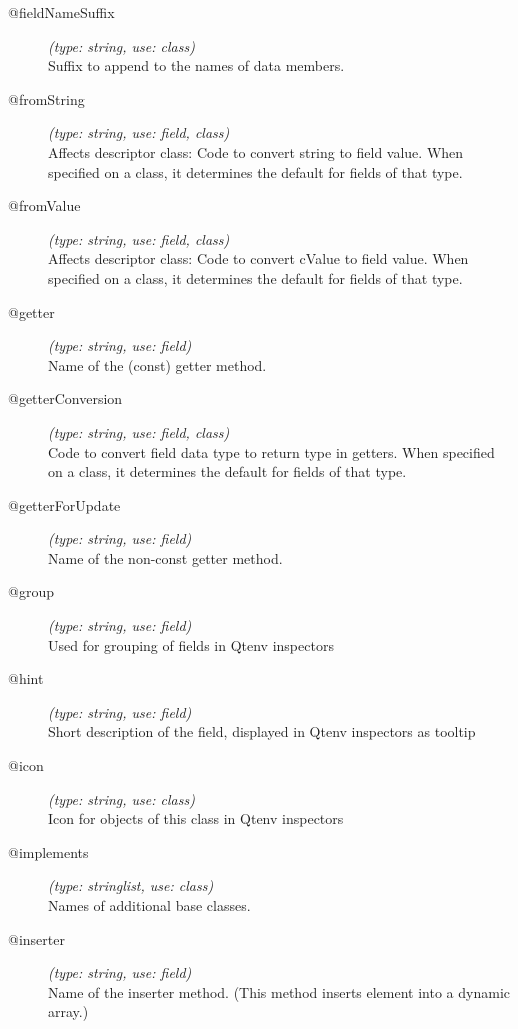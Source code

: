 \begin{description}
\item[@fieldNameSuffix] \textit{(type: string, use: class)} \\
  Suffix to append to the names of data members.

\item[@fromString] \textit{(type: string, use: field, class)} \\
  Affects descriptor class: Code to convert string to field value. When
  specified on a class, it determines the default for fields of that type.

\item[@fromValue] \textit{(type: string, use: field, class)} \\
  Affects descriptor class: Code to convert cValue to field value. When
  specified on a class, it determines the default for fields of that type.

\item[@getter] \textit{(type: string, use: field)} \\
  Name of the (const) getter method.

\item[@getterConversion] \textit{(type: string, use: field, class)} \\
  Code to convert field data type to return type in getters. When specified on
  a class, it determines the default for fields of that type.

\item[@getterForUpdate] \textit{(type: string, use: field)} \\
  Name of the non-const getter method.

\item[@group] \textit{(type: string, use: field)} \\
  Used for grouping of fields in Qtenv inspectors

\item[@hint] \textit{(type: string, use: field)} \\
  Short description of the field, displayed in Qtenv inspectors as tooltip

\item[@icon] \textit{(type: string, use: class)} \\
  Icon for objects of this class in Qtenv inspectors

\item[@implements] \textit{(type: stringlist, use: class)} \\
  Names of additional base classes.

\item[@inserter] \textit{(type: string, use: field)} \\
  Name of the inserter method. (This method inserts element into a dynamic
  array.)


\end{description}
